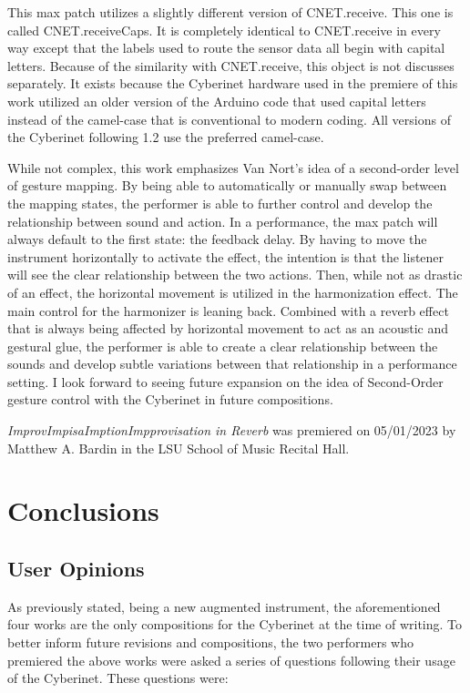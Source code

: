 This max patch utilizes a slightly different version of CNET.receive. This one is called CNET.receiveCaps. It is completely identical to CNET.receive in every way except that the labels used to route the sensor data all begin with capital letters. Because of the similarity with CNET.receive, this object is not discusses separately. It exists because the Cyberinet hardware used in the premiere of this work utilized an older version of the Arduino code that used capital letters instead of the camel-case that is conventional to modern coding. All versions of the Cyberinet following 1.2 use the preferred camel-case.

While not complex, this work emphasizes Van Nort's idea of a second-order level of gesture mapping\cite{vanNortMapping2007}. By being able to automatically or manually swap between the mapping states, the performer is able to further control and develop the relationship between sound and action. In a performance, the max patch will always default to the first state: the feedback delay. By having to move the instrument horizontally to activate the effect, the intention is that the listener will see the clear relationship between the two actions. Then, while not as drastic of an effect, the horizontal movement is utilized in the harmonization effect. The main control for the harmonizer is leaning back. Combined with a reverb effect that is always being affected by horizontal movement to act as an acoustic and gestural glue, the performer is able to create a clear relationship between the sounds and develop subtle variations between that relationship in a performance setting. I look forward to seeing future expansion on the idea of Second-Order gesture control with the Cyberinet in future compositions.

\textit{ImprovImpisaImptionImpprovisation in Reverb} was premiered on 05/01/2023 by Matthew A. Bardin in the LSU School of Music Recital Hall.

\chapter{Conclusions} %

\section{User Opinions}

As previously stated, being a new augmented instrument, the aforementioned four works are the only compositions for the Cyberinet at the time of writing. To better inform future revisions and compositions, the two performers who premiered the above works were asked a series of questions following their usage of the Cyberinet. These questions were:

